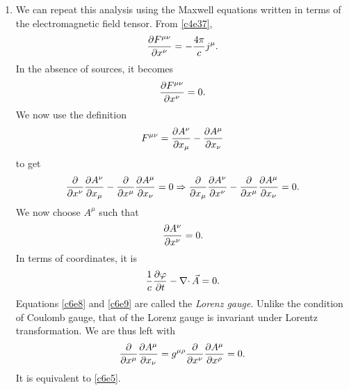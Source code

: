 \begin{enumerate}
\item We can repeat this analysis using the Maxwell equations written in terms of
the electromagnetic field tensor. From \eqref{c4e37},
\[
\frac{\partial{F^{\mu\nu}}}{\partial{x^\nu}} = -\frac{4\pi}{c}j^\mu.
\]
In the absence of sources, it becomes
\[
\frac{\partial{F^{\mu\nu}}}{\partial{x^\nu}} = 0.
\]
We now use the definition 
\[
F^{\mu\nu} = \frac{\partial{A^\nu}}{\partial{x_\mu}} - \frac{\partial{A^\mu}}{\partial{x_\nu}}
\]
to get
\[
\frac{\partial}{\partial x^\nu}\frac{\partial{A^\nu}}{\partial{x_\mu}} - 
\frac{\partial}{\partial x^\mu}\frac{\partial{A^\mu}}{\partial{x_\nu}} = 0
\Rightarrow
\frac{\partial}{\partial x_\mu}\frac{\partial{A^\nu}}{\partial{x^\nu}} - 
\frac{\partial}{\partial x^\mu}\frac{\partial{A^\mu}}{\partial{x_\nu}} = 0.
\]
We now choose $A^\mu$ such that
\begin{equation}\label{c6e8}
\frac{\partial{A^\nu}}{\partial{x^\nu}} = 0.
\end{equation}
In terms of coordinates, it is
\begin{equation}\label{c6e9}
\frac{1}{c}\frac{\partial{\varphi}}{\partial{t}} - \operatorname{\nabla\cdot}\vec{A} = 0.
\end{equation}
Equations \eqref{c6e8} and \eqref{c6e9} are called the \emph{Lorenz gauge}. 
Unlike the condition of Coulomb gauge, that of the Lorenz gauge is invariant 
under Lorentz transformation. We are thus left with
\begin{equation}\label{c6e10}
\frac{\partial}{\partial x^\mu}\frac{\partial{A^\mu}}{\partial{x_\nu}} = 
g^{\mu\rho}\frac{\partial}{\partial x^\nu}\frac{\partial{A^\mu}}{\partial{x^\rho}} = 0.
\end{equation}
It is equivalent to \eqref{c6e5}.


\end{enumerate}
